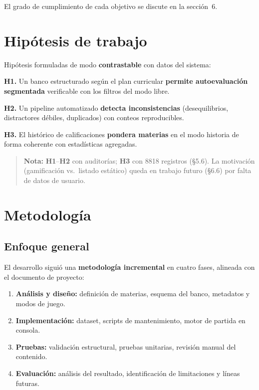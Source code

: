 \documentclass[11pt,a4paper]{article}
\newcommand{\bloquetfg}[1]{\par\smallskip\noindent #1\par}
\begin{document}
\bloquetfg{El grado de cumplimiento de cada objetivo se discute en la sección~6.}

\section{Hipótesis de trabajo}

Hipótesis formuladas de modo \textbf{contrastable} con datos del sistema:

\textbf{H1.} Un banco estructurado según el plan curricular \textbf{permite autoevaluación segmentada} verificable con los filtros del modo libre.

\textbf{H2.} Un pipeline automatizado \textbf{detecta inconsistencias} (desequilibrios, distractores débiles, duplicados) con conteos reproducibles.

\textbf{H3.} El histórico de calificaciones \textbf{pondera materias} en el modo historia de forma coherente con estadísticas agregadas.

\begin{quote}
\textbf{Nota:} \textbf{H1}--\textbf{H2} con auditorías; \textbf{H3} con 8818 registros (§5.6). La motivación (gamificación vs.\ listado estático) queda en trabajo futuro (§6.6) por falta de datos de usuario.
\end{quote}

\section{Metodología}

\subsection{Enfoque general}

El desarrollo siguió una \textbf{metodología incremental} en cuatro fases, alineada con el documento de proyecto:
\begin{enumerate}
  \item \textbf{Análisis y diseño:} definición de materias, esquema del banco, metadatos y modos de juego.
  \item \textbf{Implementación:} dataset, scripts de mantenimiento, motor de partida en consola.
  \item \textbf{Pruebas:} validación estructural, pruebas unitarias, revisión manual del contenido.
  \item \textbf{Evaluación:} análisis del resultado, identificación de limitaciones y líneas futuras.
\end{enumerate}
\end{document}
